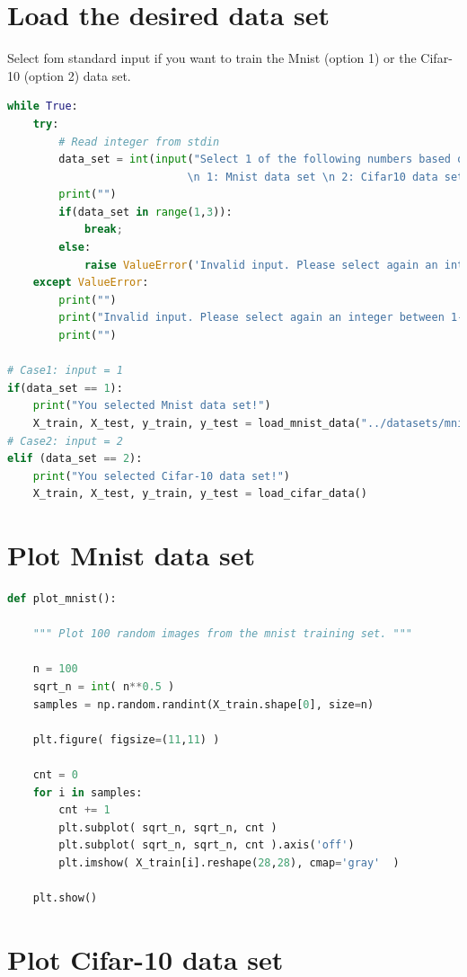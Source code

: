 \documentclass[11pt]{article}
\begin{document}
\section{Load the desired data set}
\noindent Select fom standard input if you want to train the Mnist (option 1) or the Cifar-10 (option 2) data set.
\begin{lstlisting}[language = Python]
while True:
    try:
        # Read integer from stdin
        data_set = int(input("Select 1 of the following numbers based on the desired data set:\n \
                            \n 1: Mnist data set \n 2: Cifar10 data set\n"))
        print("")
        if(data_set in range(1,3)):
            break;
        else:
            raise ValueError('Invalid input. Please select again an integer between 1-2!')
    except ValueError:
        print("")
        print("Invalid input. Please select again an integer between 1-2!")
        print("")
            
# Case1: input = 1
if(data_set == 1):
    print("You selected Mnist data set!")
    X_train, X_test, y_train, y_test = load_mnist_data("../datasets/mnistdata/")
# Case2: input = 2
elif (data_set == 2):
    print("You selected Cifar-10 data set!")
    X_train, X_test, y_train, y_test = load_cifar_data()
\end{lstlisting}

\newpage
\section{Plot Mnist data set}

\begin{lstlisting}[language = Python]
def plot_mnist():
    
    """ Plot 100 random images from the mnist training set. """
    
    n = 100
    sqrt_n = int( n**0.5 )
    samples = np.random.randint(X_train.shape[0], size=n)

    plt.figure( figsize=(11,11) )

    cnt = 0
    for i in samples:
        cnt += 1
        plt.subplot( sqrt_n, sqrt_n, cnt )
        plt.subplot( sqrt_n, sqrt_n, cnt ).axis('off')
        plt.imshow( X_train[i].reshape(28,28), cmap='gray'  )

    plt.show()
\end{lstlisting}


\section{Plot Cifar-10 data set }
\end{document}
